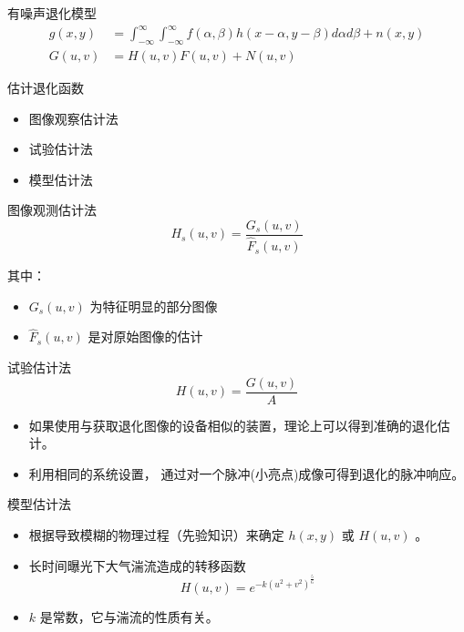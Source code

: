 \documentclass[presentation]{beamer}
\begin{document}
\begin{frame}[label={sec:org4c3a71f}]{有噪声退化模型}
\begin{align*}
g(x,y) &=\int_{-\infty}^{\infty}\int_{-\infty}^{\infty} f(\alpha,\beta)h(x-\alpha,y-\beta) d\alpha d\beta +n(x,y)\\
G(u,v) &= H(u,v)F(u,v)+N(u,v)
\end{align*}
\end{frame}

\begin{frame}[label={sec:org7352e74}]{估计退化函数}
\begin{itemize}
\item 图像观察估计法
\item 试验估计法
\item 模型估计法
\end{itemize}
\end{frame}

\begin{frame}[label={sec:org86cce5a}]{图像观测估计法}
\[ H_s(u,v) = \frac{G_s(u,v)}{\hat F_s(u,v)} \]

其中：
\begin{itemize}
\item \(G_s(u,v)\) 为特征明显的部分图像
\item \(\hat F_s(u,v)\) 是对原始图像的估计
\end{itemize}
\end{frame}

\begin{frame}[label={sec:orgdd5312b}]{试验估计法}
\[ H(u,v)=\frac{G(u,v)}{A} \]

\begin{itemize}
\item 如果使用与获取退化图像的设备相似的装置，理论上可以得到准确的退化估计。
\item 利用相同的系统设置， 通过对一个脉冲(小亮点)成像可得到退化的脉冲响应。
\end{itemize}
\end{frame}

\begin{frame}[label={sec:org3b6acc9}]{模型估计法}
\begin{itemize}
\item 根据导致模糊的物理过程（先验知识）来确定 \(h(x,y)\) 或 \(H(u,v)\) 。
\item 长时间曝光下大气湍流造成的转移函数
\[ H(u,v) = e^{-k(u^2+v^2)^{\frac{5}{6}}} \]
\item \(k\) 是常数，它与湍流的性质有关。
\end{itemize}
\end{frame}
\end{document}
